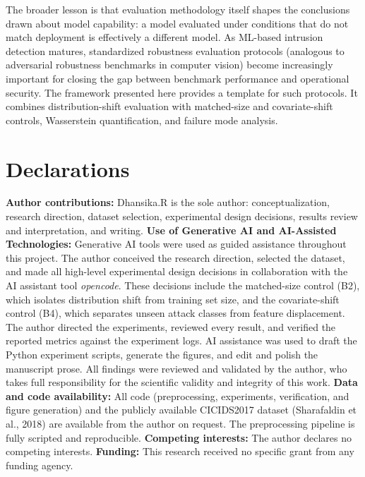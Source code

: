 \documentclass[10pt]{article}
\begin{document}
The broader lesson is that evaluation methodology itself shapes the conclusions drawn about model capability: a model evaluated under conditions that do not match deployment is effectively a different model. As ML-based intrusion detection matures, standardized robustness evaluation protocols (analogous to adversarial robustness benchmarks in computer vision) become increasingly important for closing the gap between benchmark performance and operational security. The framework presented here provides a template for such protocols. It combines distribution-shift evaluation with matched-size and covariate-shift controls, Wasserstein quantification, and failure mode analysis.
\section*{Declarations}
\textbf{Author contributions:} Dhansika.R is the sole author: conceptualization, research direction, dataset selection, experimental design decisions, results review and interpretation, and writing.
\textbf{Use of Generative AI and AI-Assisted Technologies:} Generative AI tools were used as guided assistance throughout this project. The author conceived the research direction, selected the dataset, and made all high-level experimental design decisions in collaboration with the AI assistant tool \textit{opencode}. These decisions include the matched-size control (B2), which isolates distribution shift from training set size, and the covariate-shift control (B4), which separates unseen attack classes from feature displacement. The author directed the experiments, reviewed every result, and verified the reported metrics against the experiment logs. AI assistance was used to draft the Python experiment scripts, generate the figures, and edit and polish the manuscript prose. All findings were reviewed and validated by the author, who takes full responsibility for the scientific validity and integrity of this work.
\textbf{Data and code availability:} All code (preprocessing, experiments, verification, and figure generation) and the publicly available CICIDS2017 dataset (Sharafaldin et al., 2018) are available from the author on request. The preprocessing pipeline is fully scripted and reproducible.
\textbf{Competing interests:} The author declares no competing interests.
\textbf{Funding:} This research received no specific grant from any funding agency.
\end{document}
